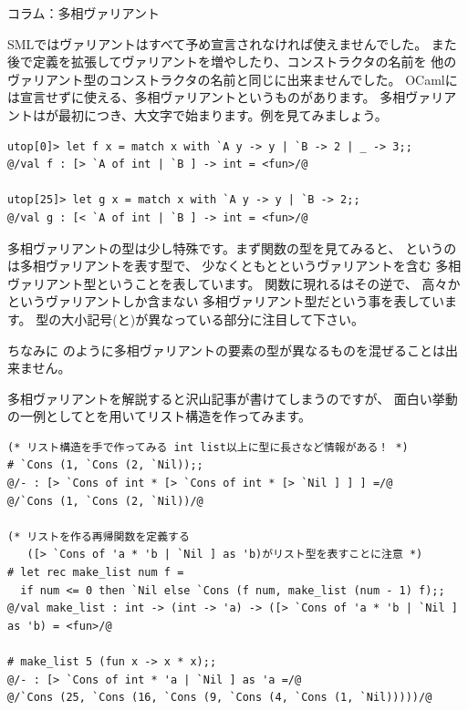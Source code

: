 \documentclass[11pt,a4paper]{article}
\begin{document}
\begin{itembox}[l]{コラム：多相ヴァリアント}

SMLではヴァリアントはすべて予め宣言されなければ使えませんでした。
また後で定義を拡張してヴァリアントを増やしたり、コンストラクタの名前を
他のヴァリアント型のコンストラクタの名前と同じに出来ませんでした。
OCaml\cite{ocaml}には宣言せずに使える、多相ヴァリアントというものがあります。
多相ヴァリアントはが最初につき、大文字で始まります。例を見てみましょう。

\begin{lstlisting}[caption=多相ヴァリアント,label=code:poly-varinat]
utop[0]> let f x = match x with `A y -> y | `B -> 2 | _ -> 3;;
@/val f : [> `A of int | `B ] -> int = <fun>/@

utop[25]> let g x = match x with `A y -> y | `B -> 2;;
@/val g : [< `A of int | `B ] -> int = <fun>/@
\end{lstlisting}

多相ヴァリアントの型は少し特殊です。まず関数の型を見てみると、
\prog{[> `A of int | `B ]}というのは多相ヴァリアントを表す型で、
少なくともとというヴァリアントを含む
多相ヴァリアント型ということを表しています。
関数に現れる\prog{[< `A of int | `B ]}はその逆で、
高々かというヴァリアントしか含まない
多相ヴァリアント型だという事を表しています。
型の大小記号(\prog{>}と\prog{<})が異なっている部分に注目して下さい。

ちなみに
のように多相ヴァリアントの要素の型が異なるものを混ぜることは出来ません。

多相ヴァリアントを解説すると沢山記事が書けてしまうのですが、
面白い挙動の一例としてとを用いてリスト構造を作ってみます。

\begin{lstlisting}[caption=多相ヴァリアントを用いたリスト構造(ocamlコード)]
(* リスト構造を手で作ってみる int list以上に型に長さなど情報がある！ *)
# `Cons (1, `Cons (2, `Nil));;
@/- : [> `Cons of int * [> `Cons of int * [> `Nil ] ] ] =/@
@/`Cons (1, `Cons (2, `Nil))/@

(* リストを作る再帰関数を定義する
   ([> `Cons of 'a * 'b | `Nil ] as 'b)がリスト型を表すことに注意 *)
# let rec make_list num f =
  if num <= 0 then `Nil else `Cons (f num, make_list (num - 1) f);;
@/val make_list : int -> (int -> 'a) -> ([> `Cons of 'a * 'b | `Nil ] as 'b) = <fun>/@

# make_list 5 (fun x -> x * x);;
@/- : [> `Cons of int * 'a | `Nil ] as 'a =/@
@/`Cons (25, `Cons (16, `Cons (9, `Cons (4, `Cons (1, `Nil)))))/@


\end{lstlisting}
\end{itembox}
\end{document}
